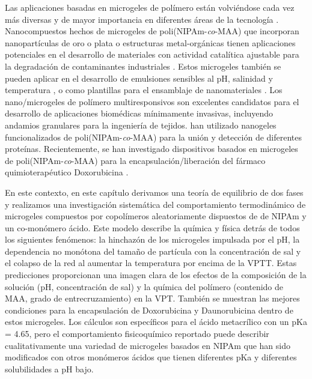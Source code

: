 Las aplicaciones basadas en microgeles de pol\'imero est\'an volvi\'endose cada vez m\'as diversas y de mayor importancia en diferentes \'areas de la tecnolog\'ia \cite{plamper2017functional}.
Nanocompuestos hechos de microgeles de poli(NIPAm-\emph{co}-MAA) que incorporan nanopart\'iculas de oro o plata o estructuras metal-org\'anicas tienen aplicaciones potenciales en el desarrollo de materiales con actividad catal\'itica ajustable para la degradaci\'on de contaminantes industriales \cite{Khan2013synthesis,Shi2014,Allegretto2020}.
Estos microgeles tambi\'en se pueden aplicar en el desarrollo de emulsiones sensibles al pH, salinidad y temperatura \cite{Ngai2005,Ngai2006,Brugger2008,Schmidt2011}, o como plantillas para el ensamblaje de nanomateriales \cite{Wong2009}.
Los nano/microgeles de pol\'imero multiresponsivos son excelentes candidatos para el desarrollo de aplicaciones biom\'edicas m\'inimamente invasivas, incluyendo andamios granulares para la ingenier\'ia de tejidos\cite{Daly2020}.
\citet{Culver2017A} han utilizado nanogeles funcionalizados de poli(NIPAm-\emph{co}-MAA) para la uni\'on y detecci\'on de diferentes prote\'inas.
Recientemente, se han investigado dispositivos basados en microgeles de poli(NIPAm-\emph{co}-MAA) para la encapsulaci\'on/liberaci\'on del f\'armaco quimioterap\'eutico Doxorubicina \cite{Giussi2020,MartinezMoro2020,Pergushov2020}.

En este contexto, en este cap\'itulo derivamos una teor\'ia de equilibrio de dos fases y realizamos una investigaci\'on sistem\'atica del comportamiento termodin\'amico de microgeles compuestos por copol\'imeros aleatoriamente dispuestos de de NIPAm y un co-mon\'omero \'acido.
Este modelo describe la qu\'imica y f\'isica detr\'as de todos los siguientes fen\'omenos: la hinchaz\'on de los microgeles impulsada por el pH, la dependencia no mon\'otona del tama\~no de part\'icula con la concentraci\'on de sal y el colapso de la red al aumentar la temperatura por encima de la VPTT.
Estas predicciones proporcionan una imagen clara de los efectos de la composici\'on de la soluci\'on (pH, concentraci\'on de sal) y la qu\'imica del pol\'imero (contenido de MAA, grado de entrecruzamiento) en la VPT.
Tambi\'en se muestran las mejores condiciones para la encapsulaci\'on de Doxorubicina y Daunorubicina dentro de estos microgeles.
Los  c\'alculos son espec\'ificos para el \'acido metacr\'ilico con un pKa = 4.65, pero el comportamiento fisicoqu\'imico reportado puede describir cualitativamente una variedad de microgeles basados en NIPAm que han sido modificados con otros mon\'omeros \'acidos que tienen diferentes pKa y diferentes solubilidades a pH bajo.


